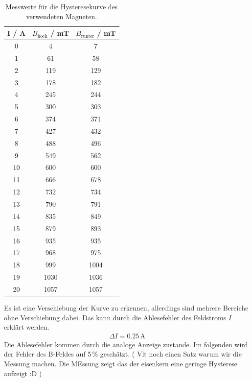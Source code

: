 \begin{table}[H] %
  \centering
  \caption{Messwerte für die Hysteresekurve des verwendeten Magneten.}
  \label{tab:Hysterese}
  \begin{tabular}{c | c c}
    I / A & $B_\text{hoch}$ / mT & $B_\text{runter}$ / mT \\
    \hline
    0 & 4 & 7 \\
    1 & 61 & 58 \\
    2 & 119 & 129 \\
    3 & 178 & 182 \\
    4 & 245 & 244 \\
    5 & 300 & 303 \\
    6 & 374 & 371 \\
    7 & 427 & 432 \\
    8 & 488 & 496 \\
    9 & 549 & 562 \\
    10 & 600 & 600 \\
    11 & 666 & 678 \\
    12 & 732 & 734 \\
    13 & 790 & 791 \\
    14 & 835 & 849 \\
    15 & 879 & 893 \\
    16 & 935 & 935 \\
    17 & 968 & 975 \\
    18 & 999 & 1004 \\
    19 & 1030 & 1036 \\
    20 & 1057 & 1057 \\
  \end{tabular}
\end{table}

Es ist eine Verschiebung der Kurve zu erkennen, allerdings sind mehrere Bereiche ohne Verschiebung dabei. Das kann durch die Ablesefehler des Feldstroms $I$ erklärt werden.
\begin{align*}
  \Delta I = 0.25\, \text{A}
\end{align*}
Die Ablesefehler kommen durch die analoge Anzeige zustande. Im folgenden wird der Fehler des B-Feldes auf 5\,\% geschätzt.
\left( Vlt noch einen Satz warum wir die Messung machen. Die MEssung zeigt das der eisenkern eine geringe Hysterese aufzeigt :D \right)


